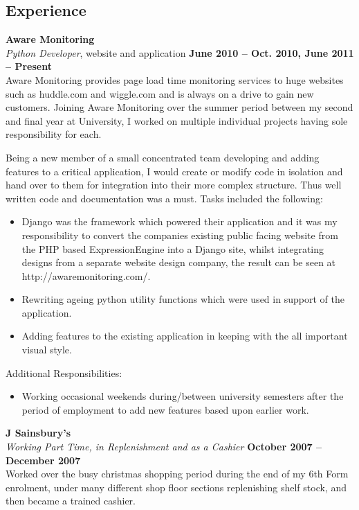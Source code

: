 \documentclass[margin,line]{resume}
\begin{document}
\begin{resume}
    \section{\mysidestyle Experience}

    \textbf{Aware Monitoring} \vspace{2mm}\\\vspace{1mm}%
    \textsl{Python Developer}, website and application \hfill \textbf{June 2010 -- Oct. 2010, June 2011 -- Present}\\
    Aware Monitoring provides page load time monitoring services to huge websites such as huddle.com and wiggle.com and is always on a drive to gain new customers.
	Joining Aware Monitoring over the summer period between my second and final year at University, I worked on multiple individual projects having sole responsibility for each.

	Being a new member of a small concentrated team developing and adding features to a critical application, I would create or modify code in isolation and hand over to them for integration into their more complex structure. Thus well written code and documentation was a must.
	Tasks included the following:
	\begin{itemize}
		\item Django was the framework which powered their application and it was my responsibility to convert the companies existing public facing website from the PHP based ExpressionEngine into a Django site, whilst integrating designs from a separate website design company, the result can be seen at http://awaremonitoring.com/.
		\item Rewriting ageing python utility functions which were used in support of the application.
		\item Adding features to the existing application in keeping with the all important visual style.
	\end{itemize}
	
	Additional Responsibilities: 
	\begin{itemize}
		\item Working occasional weekends during/between university semesters after the period of employment to add new features based upon earlier work.
	\end{itemize}
	
	\newpage
	\textbf{J Sainsbury's} \vspace{2mm}\\\vspace{1mm}%
	\textsl{Working Part Time, in Replenishment and as a Cashier}  \hfill \textbf{October 2007 -- December 2007}\\
	Worked over the busy christmas shopping period during the end of my 6th Form enrolment, under many different shop floor sections replenishing shelf stock, and then became a trained cashier.
	

\end{resume}
\end{document}
